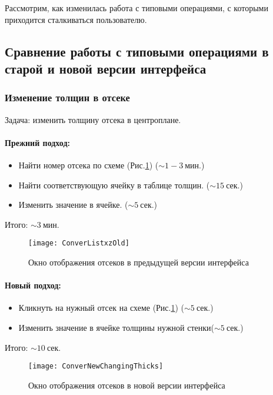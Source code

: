 Рассмотрим, как изменилась работа с типовыми операциями, с которыми приходится сталкиваться пользователю. 


\subsection{Сравнение работы с типовыми операциями в старой и новой версии интерфейса}

\subsubsection{Изменение толщин в отсеке}

Задача: изменить толщину отсека в центроплане. 

\paragraph{Прежний подход:} 

\begin{itemize}
\item Найти номер отсека по схеме (Рис.\ref{fig:ConverListxzOld}) ($\sim1-3~\text{мин.}$)
\item Найти соответствующую ячейку в таблице толщин. ($\sim15~\text{сек.}$)
\item Изменить значение в ячейке. ($\sim5~\text{сек.}$)
\end{itemize}

Итого: $\sim3~\text{мин.}$

\begin{figure}[ht]
\centering
\texttt{[image: ConverListxzOld]}
\caption{Окно отображения отсеков в предыдущей версии интерфейса}
\label{fig:ConverListxzOld}
\end{figure}

\paragraph{Новый подход:}

\begin{itemize}
\item Кликнуть на нужный отсек на схеме (Рис.\ref{fig:ConverListxzOld}) ($\sim5~\text{сек.}$)
\item Изменить значение в ячейке толщины нужной стенки($\sim5~\text{сек.}$)
\end{itemize}

Итого: $\sim10~\text{сек.}$

\begin{figure}[ht]
\centering
\texttt{[image: ConverNewChangingThicks]}
\caption{Окно отображения отсеков в новой версии интерфейса}
\label{ConverNewChangingThicks}
\end{figure}

